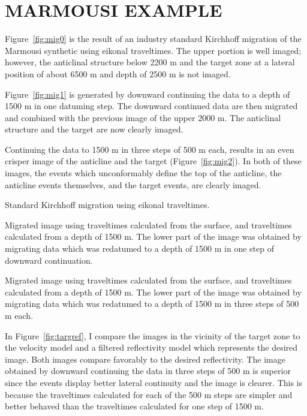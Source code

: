 


\section{MARMOUSI EXAMPLE}

Figure~\ref{fig:mig0} is the result of
an industry standard Kirchhoff migration
of the Marmousi synthetic using eikonal traveltimes. The upper
portion is well imaged; however, the anticlinal structure below 2200 m and
the target zone at a lateral position of about 6500 m 
and depth of 2500 m is not imaged.

Figure~\ref{fig:mig1} is generated by downward continuing the data
to a depth of 1500 m in one datuming step. The downward
continued data are then migrated and combined with the previous image of
the upper 2000 m. The anticlinal structure and the target are now clearly
imaged.

Continuing the data to 1500 m in three steps of 500 m each, results
in an even crisper
image of the anticline and the target (Figure~\ref{fig:mig2}).
In both of these images,
the events which unconformably define the top of the anticline,
the anticline events themselves, and the target events, are clearly
imaged.

{Standard Kirchhoff migration using eikonal traveltimes.}

{Migrated image using traveltimes calculated from the surface, and
traveltimes calculated from a depth of 1500 m.
The lower part of the image was obtained by migrating data which
was redatumed to a depth of 1500 m in one step
of downward continuation.}

{Migrated image using traveltimes calculated from the surface, and 
traveltimes calculated from a depth of 1500 m.
The lower part of the image was obtained by migrating data which
was redatumed to a depth of 1500 m in three steps of 500 m each.}

In Figure~\ref{fig:targref}, I compare the images in the vicinity
of the target zone to the velocity model and a filtered reflectivity
model which represents the desired image.
Both images compare favorably to the desired reflectivity.
The image obtained by downward continuing the data in three steps
of 500 m is superior since the events display 
better lateral continuity and the image is clearer.
This is because the traveltimes calculated for each of the 500 m steps
are simpler and better behaved than the traveltimes calculated
for one step of 1500 m.

